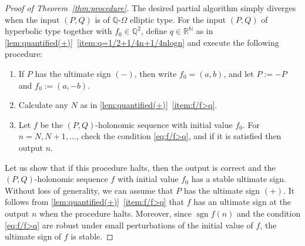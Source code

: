 \documentclass[a4paper,UKenglish,cleveref,autoref,thm-restate]{lipics-v2021}
\newcommand{\R}{\mathbb{R}}
\newcommand{\N}{\mathbb{N}}
\newcommand{\Q}{\mathbb{Q}}
\DeclareMathOperator{\sgn}{sgn}
\begin{document}
\begin{proof}[Proof of Theorem~\ref{thm:procedure}]
The desired partial algorithm simply diverges when the input $(P, Q)$ is of $\Q$-$\Omega$ elliptic type. 
For the input $(P, Q)$ of hyperbolic type together with $f_0 \in \Q^2$, define $q \in \R^{\N}$ as in \cref{lem:quantified(+)}~\eqref{item:q=1/2+1/4n+1/4nlogn} and execute the following procedure:

\begin{enumerate}
\item 
If $P$ has the ultimate sign $(-)$, then write $f_0 = (a, b)$, and let $P := -P$ and $f_0 := (a, -b)$.

\item \label{item:initialN}
Calculate any $N$ as in \cref{lem:quantified(+)}~\eqref{item:f/f>q}. 

\item 
Let $f$ be the $(P, Q)$-holonomic sequence with initial value $f_0$. For $n = N, N+1, \dots$, check the condition \eqref{eq:f/f>q}, and if it is satisfied then output $n$. 
\end{enumerate}

Let us show that if this procedure halts, then the output is correct and the $(P, Q)$-holonomic sequence $f$ with initial value $f_0$ has a stable ultimate sign. Without loss of generality, we can assume that $P$ has the ultimate sign $(+)$. 
It follows from \cref{lem:quantified(+)}~\eqref{item:f/f>q} that $f$ has an ultimate sign at the output $n$ when the procedure halts. Moreover, since $\sgn f(n)$ and the condition \eqref{eq:f/f>q} are robust under small perturbations of the initial value of $f$, the ultimate sign of $f$ is stable. 


\end{proof}
\end{document}
